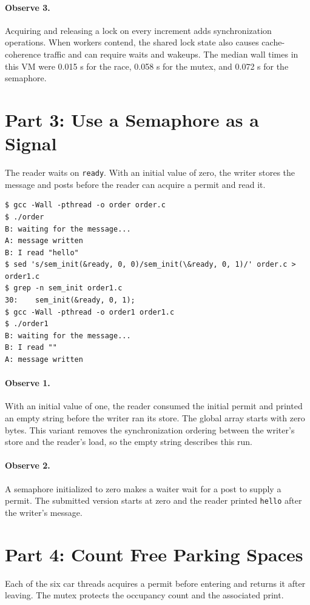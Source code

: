 \documentclass[12pt,a4paper]{article}
\begin{document}
\paragraph{Observe 3.} Acquiring and releasing a lock on every increment adds
synchronization operations. When workers contend, the shared lock state also
causes cache-coherence traffic and can require waits and wakeups.
The median wall times in this VM were 0.015 s for the race, 0.058 s for the mutex, and 0.072 s for the semaphore.

\section{Part 3: Use a Semaphore as a Signal}
The reader waits on \texttt{ready}. With an initial value of zero, the writer
stores the message and posts before the reader can acquire a permit and read it.

\begin{lstlisting}[caption={Signal experiment with initial values zero and one}]
$ gcc -Wall -pthread -o order order.c
$ ./order
B: waiting for the message...
A: message written
B: I read "hello"
$ sed 's/sem_init(&ready, 0, 0)/sem_init(\&ready, 0, 1)/' order.c > order1.c
$ grep -n sem_init order1.c
30:    sem_init(&ready, 0, 1);
$ gcc -Wall -pthread -o order1 order1.c
$ ./order1
B: waiting for the message...
B: I read ""
A: message written
\end{lstlisting}

\paragraph{Observe 1.} With an initial value of one, the reader consumed the
initial permit and printed an empty string before the writer ran its store. The
global array starts with zero bytes. This variant removes the synchronization
ordering between the writer's store and the reader's load, so the empty string
describes this run.

\paragraph{Observe 2.} A semaphore initialized to zero makes a waiter wait for a
post to supply a permit. The submitted version starts at zero and the reader
printed \texttt{hello} after the writer's message.

\section{Part 4: Count Free Parking Spaces}
Each of the six car threads acquires a permit before entering and returns it
after leaving. The mutex protects the occupancy count and the associated print.
\end{document}
